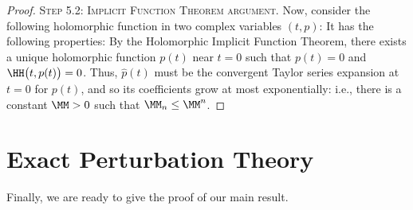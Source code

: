 \documentclass[11pt]{article}
\begin{document}
\begin{proof}
\textsc{Step 5.2: Implicit Function Theorem argument.}
Now, consider the following holomorphic function in two complex variables $(t,p)$:
It has the following properties:
By the Holomorphic Implicit Function Theorem, there exists a unique holomorphic function $p (t)$ near $t = 0$ such that $p (t) = 0$ and $\HH \big(t, p (t)\big) = 0$.
Thus, $\hat{p} (t)$ must be the convergent Taylor series expansion at $t = 0$ for $p(t)$, and so its coefficients grow at most exponentially: i.e., there is a constant $\MM > 0$ such that $\MM_n \leq \MM^n$.
\end{proof}


\section{Exact Perturbation Theory}
\label{220112110800}

Finally, we are ready to give the proof of our main result.
\end{document}
